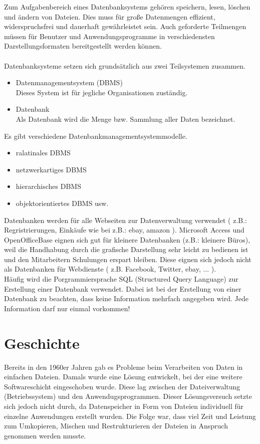 \documentclass[12pt,a4paper]{report}
\begin{document}
\begin{onehalfspace}
Zum Aufgabenbereich eines Datenbanksystems gehören speichern, lesen, löschen und ändern von Dateien. Dies muss für große Datenmengen effizient, widerspruchsfrei und dauerhaft gewährleistet sein. Auch geforderte Teilmengen müssen für Benutzer und Anwendungsprogramme in verschiedensten Darstellungsformaten bereitgestellt werden können.\\
\\Datenbanksysteme setzen sich grundsätzlich aus zwei Teilsystemen zusammen.
\begin{itemize}
\item Datenmanagementsystem (DBMS)\\
Dieses System ist für jegliche Organisationen zuständig.
\item Datenbank\\
Als Datenbank wird die Menge bzw. Sammlung aller Daten bezeichnet.
\end{itemize} 
Es gibt verschiedene Datenbankmanagementsystemmodelle.
\begin{itemize}
\item ralatinales DBMS
\item netzwerkartiges DBMS
\item hierarchisches DBMS
\item objektorientiertes DBMS usw.
\end{itemize}
Datenbanken werden für alle Webseiten zur Datenverwaltung verwendet ( z.B.: Regristrierungen, Einkäufe wie bei z.B.: ebay, amazon ).
Microsoft Access und OpenOfficeBase eignen sich gut für kleinere Datenbanken (z.B.: kleinere Büros), weil die Handhabung durch die grafische Darstellung sehr leicht zu bedienen ist und den Mitarbeitern Schulungen erspart bleiben.
Diese eignen sich jedoch nicht als Datenbanken für Webdienste ( z.B. Facebook, Twitter, ebay, ... ).\\

Häufig wird die Porgrammiersprache SQL (Structured Query Language) zur Erstellung einer Datenbank verwendet. Dabei ist bei der Erstellung von einer Datenbank zu beachten, dass keine Information mehrfach angegeben wird. Jede Information darf nur einmal vorkommen!

\section{Geschichte}
Bereits in den 1960er Jahren gab es Probleme beim Verarbeiten von Daten in einfachen Dateien. Damals wurde eine Lösung entwickelt, bei der eine weitere Softwareschicht eingeschoben wurde. Diese lag zwischen der Dateiverwaltung (Betriebssystem) und den Anwendugsprogrammen. Dieser Lösungsversuch setzte sich jedoch nicht durch, da Datenspeicher in Form von Dateien individuell für einzelne Anwendungen erstellt wurden. Die Folge war, dass viel Zeit und Leistung zum Umkopieren, Mischen und Restrukturieren der Dateien in Anspruch genommen werden musste.\\


\end{onehalfspace}
\end{document}
